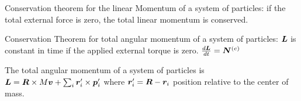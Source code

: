 \documentclass[12pt]{article}
\begin{document}
Conservation theorem for the linear Momentum of a system of particles: 
if the total external force is zero, the total linear momentum is conserved.

Conservation Theorem for total angular momentum of a system of particles: $\boldsymbol{L}$ is constant in time 
if the applied external torque is zero. $\frac{d\boldsymbol{L}}{dt} = \boldsymbol{N}^{(e)}$

The total angular momentum of a system of particles is $\boldsymbol{L} = \boldsymbol{R} \times M \boldsymbol{v} + \sum_i \boldsymbol{r}_i' \times \boldsymbol{p}_i'$ 
where $\boldsymbol{r}_i' = \boldsymbol{R} - \boldsymbol{r}_i$ position relative to the center of mass.
\end{document}
